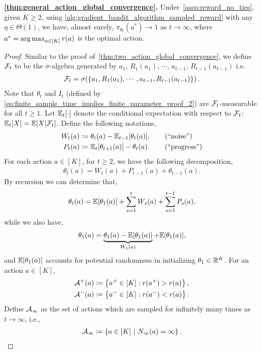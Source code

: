 \textbf{\cref{thm:general_action_global_convergence}.}
Under~\cref{assp:reward_no_ties}, given $K \ge 2$, using \cref{alg:gradient_bandit_algorithm_sampled_reward} with any $\eta \in \Theta(1)$, we have, almost surely, $\pi_{\theta_t}(a^*) \to 1$ as $t \to \infty$, where $a^* = \operatorname*{arg\,max}_{a \in [K]}{ r(a) }$ is the optimal action.
\begin{proof}
Similar to the proof of~\cref{thm:two_action_global_convergence}, we define ${\mathcal{F}}_t$ to be the $\sigma$-algebra generated by $a_1$, $R_1(a_1)$, $\cdots$, $a_{t-1}$, $R_{t-1}(a_{t-1})$ i.e. 
\begin{align}
\label{eq:general_action_global_convergence_proof_1}
    {\mathcal{F}}_t = \sigma( \{ a_1, R_1(a_1), \cdots, a_{t-1}, R_{t-1}(a_{t-1}) \} )\,.
\end{align}
Note that $\theta_{t}$ and $I_t$ (defined by \cref{eq:finite_sample_time_implies_finite_parameter_proof_2}) are ${\mathcal{F}}_t$-measurable for all $t\ge 1$. Let $\mathbb{E}_t[\cdot]$ denote the conditional expectation with respect to ${\mathcal{F}}_t$: $\mathbb{E}_t[X] = \mathbb{E}[X|{\mathcal{F}}_t]$. Define the following notations,
\begin{align}
W_t(a) &\coloneqq \theta_t(a) - \mathbb{E}_{t-1}{[ \theta_t(a)]}, \qquad \left( \text{``noise''} \right) \\
P_t(a) &\coloneqq \mathbb{E}_t[\theta_{t+1}(a)] - \theta_t(a). \qquad \left( \text{``progress''} \right)
\end{align}
For each action $a \in [K]$, for $t \ge 2$, we have the following decomposition,
\begin{align}
\theta_{t}(a) = W_t(a) + P_{t-1}(a) + \theta_{t-1}(a).
\end{align}
By recursion we can determine that,
\begin{align}
\theta_t(a) = \mathbb{E}[\theta_1(a)] + \sum_{s=1}^{t}{W_s(a)} + \sum_{s=1}^{t-1}{P_s(a)},
\end{align}
while we also have,
\begin{align}
\theta_1(a) = \underbrace{ \theta_{1}(a) - \mathbb{E}[\theta_{1}(a)] }_{ W_1(a) } + \mathbb{E}[\theta_{1}(a)],
\end{align}
and $\mathbb{E}[\theta_{1}(a)]$ accounts for potential randomness in initializing $\theta_1 \in {\mathbb{R}}^K$. For an action $a \in [K]$, 
\begin{align}
\label{eq:general_action_global_convergence_first_part_proof_6}
    {\mathcal{A}}^+(a) &\coloneqq \left\{ a^+ \in [K]: r(a^+) > r(a) \right\}, \\
    {\mathcal{A}}^-(a) &\coloneqq \left\{ a^- \in [K]: r(a^-) < r(a) \right\}. 
\end{align}
Define ${\mathcal{A}}_\infty$ as the set of actions which are sampled for infinitely many times as $t \to \infty$, i.e.,
\begin{align}
    {\mathcal{A}}_\infty \coloneqq \left\{ a \in [K] \ | \ N_\infty(a) = \infty \right\}.
\end{align}


\end{proof}
